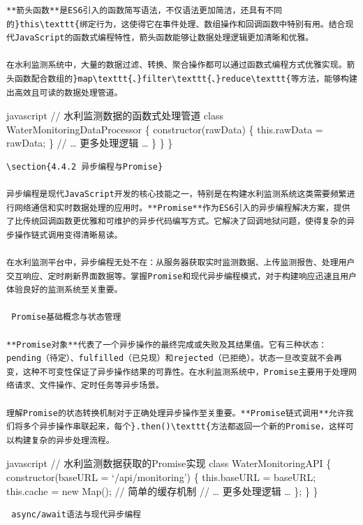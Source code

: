 {{\begin{lstlisting}
**箭头函数**是ES6引入的函数简写语法，不仅语法更加简洁，还具有不同的}this\texttt{绑定行为，这使得它在事件处理、数组操作和回调函数中特别有用。结合现代JavaScript的函数式编程特性，箭头函数能够让数据处理逻辑更加清晰和优雅。

在水利监测系统中，大量的数据过滤、转换、聚合操作都可以通过函数式编程方式优雅实现。箭头函数配合数组的}map\texttt{、}filter\texttt{、}reduce\texttt{等方法，能够构建出高效且可读的数据处理管道。
\end{lstlisting}

javascript // 水利监测数据的函数式处理管道 class WaterMonitoringDataProcessor \{ constructor(rawData) \{ this.rawData = rawData; \} // \ldots{} 更多处理逻辑 \ldots{} \} \} \}

\begin{lstlisting}
\section{4.4.2 异步编程与Promise}

异步编程是现代JavaScript开发的核心技能之一，特别是在构建水利监测系统这类需要频繁进行网络通信和实时数据处理的应用时。**Promise**作为ES6引入的异步编程解决方案，提供了比传统回调函数更优雅和可维护的异步代码编写方式。它解决了回调地狱问题，使得复杂的异步操作链式调用变得清晰易读。

在水利监测平台中，异步编程无处不在：从服务器获取实时监测数据、上传监测报告、处理用户交互响应、定时刷新界面数据等。掌握Promise和现代异步编程模式，对于构建响应迅速且用户体验良好的监测系统至关重要。

 Promise基础概念与状态管理

**Promise对象**代表了一个异步操作的最终完成或失败及其结果值。它有三种状态：pending（待定）、fulfilled（已兑现）和rejected（已拒绝）。状态一旦改变就不会再变，这种不可变性保证了异步操作结果的可靠性。在水利监测系统中，Promise主要用于处理网络请求、文件操作、定时任务等异步场景。

理解Promise的状态转换机制对于正确处理异步操作至关重要。**Promise链式调用**允许我们将多个异步操作串联起来，每个}.then()\texttt{方法都返回一个新的Promise，这样可以构建复杂的异步处理流程。
\end{lstlisting}

javascript // 水利监测数据获取的Promise实现 class WaterMonitoringAPI \{ constructor(baseURL = `/api/monitoring') \{ this.baseURL = baseURL; this.cache = new Map(); // 简单的缓存机制 // \ldots{} 更多处理逻辑 \ldots{} \}; \} \}

\begin{lstlisting}
 async/await语法与现代异步编程


\end{lstlisting}}}

